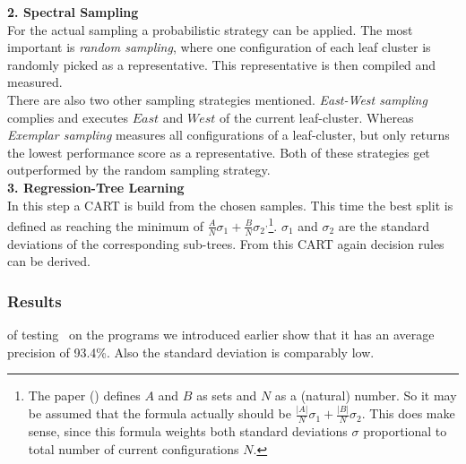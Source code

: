 \noindent
\textbf{2. Spectral Sampling}\\
\noindent
For the actual sampling a probabilistic strategy can be applied.
The most important is \textit{random sampling}, where one configuration of each leaf cluster is randomly picked as a representative. This representative is then compiled and measured.\\
There are also two other sampling strategies mentioned. \textit{East-West sampling} complies and executes $East$ and $West$ of the current leaf-cluster. Whereas \textit{Exemplar sampling} measures all configurations of a leaf-cluster, but only returns the lowest performance score as a representative. Both of these strategies get outperformed by the random sampling strategy.
\\

\noindent
\textbf{3. Regression-Tree Learning}\\
\noindent
In this step a CART is build from the chosen samples. This time the best split is defined as reaching the minimum of $\frac{A}{N}\sigma_1+\frac{B}{N}\sigma_2$$^,$\footnote{The paper (\cite{FasterDiscoveryofFasterSystemConfigurationsSiegmund2017}) defines $A$ and $B$ as sets and $N$ as a (natural) number. So it may be assumed that the formula actually should be $\frac{|A|}{N}\sigma_1+\frac{|B|}{N}\sigma_2$. This does make sense, since this formula weights both standard deviations $\sigma$ proportional to total number of current configurations $N$.}. $\sigma_1$ and $\sigma_2$ are the standard deviations of the corresponding sub-trees. From this CART again decision rules can be derived.

\subsubsection{Results} of testing \WHAT~on the programs we introduced earlier show that it has an average precision of 93.4\%. Also the standard deviation is comparably low.\cite{FasterDiscoveryofFasterSystemConfigurationsSiegmund2017}